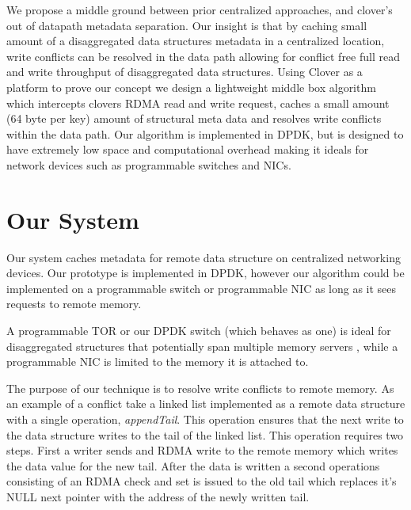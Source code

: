 We propose a middle ground between prior centralized approaches, and
clover's out of datapath metadata separation. Our insight is that by
caching small amount of a disaggregated data structures metadata in a
centralized location, write conflicts can be resolved in the data path
allowing for conflict free full read and write throughput of
disaggregated data structures.  Using Clover as a platform to prove
our concept we design a lightweight middle box algorithm which
intercepts clovers RDMA read and write request, caches a small amount
(64 byte per key) amount of structural meta data and resolves write
conflicts within the data path.  Our algorithm is implemented in DPDK,
but is designed to have extremely low space and computational overhead
making it ideals for network devices such as programmable switches and
NICs.



\section{Our System}

Our system caches metadata for remote data structure on centralized
networking devices. Our prototype is implemented in DPDK, however our
algorithm could be implemented on a programmable switch or
programmable NIC as long as it sees requests to remote memory. 

A programmable TOR or our DPDK switch (which behaves as one) is ideal
for disaggregated structures that potentially span multiple memory
servers , while a programmable NIC is limited to the memory it is
attached to. 

The purpose of our technique is to resolve write conflicts to remote
memory. As an example of a conflict take a linked list implemented as
a remote data structure with a single operation, \textit{appendTail}.
This operation ensures that the next write to the data structure writes
to the tail of the linked list. This operation requires two steps.
First a writer sends and RDMA write to the remote memory which writes
the data value for the new tail. After the data is written a second
operations consisting of an RDMA check and set is issued to the old
tail which replaces it's NULL next pointer with the address of the
newly written tail.

